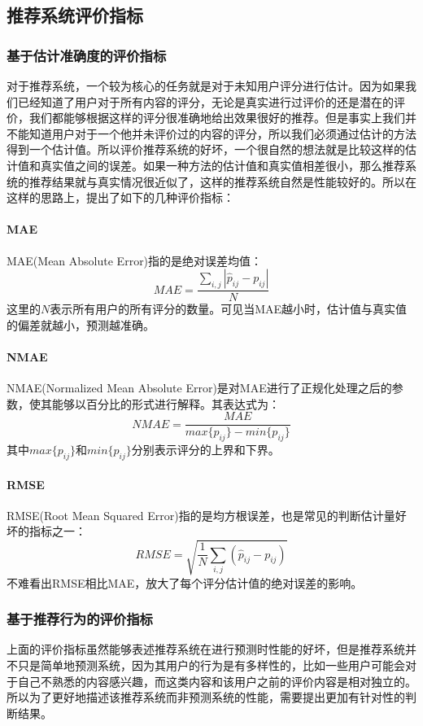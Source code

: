 \subsection{推荐系统评价指标}
\subsubsection{基于估计准确度的评价指标}
对于推荐系统，一个较为核心的任务就是对于未知用户评分进行估计。因为如果我们已经知道了用户对于所有内容的评分，无论是真实进行过评价的还是潜在的评价，我们都能够根据这样的评分很准确地给出效果很好的推荐。但是事实上我们并不能知道用户对于一个他并未评价过的内容的评分，所以我们必须通过估计的方法得到一个估计值。所以评价推荐系统的好坏，一个很自然的想法就是比较这样的估计值和真实值之间的误差。如果一种方法的估计值和真实值相差很小，那么推荐系统的推荐结果就与真实情况很近似了，这样的推荐系统自然是性能较好的。所以在这样的思路上，提出了如下的几种评价指标\cite{EVA}：
\paragraph{MAE}
MAE(Mean Absolute Error)指的是绝对误差均值\cite{MAE}：
\begin{equation}
    MAE = \frac{\sum_{i, j}|\hat p_{ij} - p_{ij}|}{N}
\end{equation}
这里的$N$表示所有用户的所有评分的数量。可见当MAE越小时，估计值与真实值的偏差就越小，预测越准确。

\paragraph{NMAE}
NMAE(Normalized Mean Absolute Error)是对MAE进行了正规化处理之后的参数，使其能够以百分比的形式进行解释\cite{MAE}。其表达式为：
\begin{equation}
    NMAE = \frac{MAE}{max\{p_{ij}\} - min\{p_{ij}\}}
\end{equation}
其中$max\{p_{ij}\}$和$min\{p_{ij}\}$分别表示评分的上界和下界。

\paragraph{RMSE}
RMSE(Root Mean Squared Error)指的是均方根误差，也是常见的判断估计量好坏的指标之一：
\begin{equation}
    RMSE = \sqrt{\frac{1}{N}\sum_{i,j}(\hat p_{ij} - p_{ij})}
\end{equation}
不难看出RMSE相比MAE，放大了每个评分估计值的绝对误差的影响。

\subsubsection{基于推荐行为的评价指标}
上面的评价指标虽然能够表述推荐系统在进行预测时性能的好坏，但是推荐系统并不只是简单地预测系统，因为其用户的行为是有多样性的，比如一些用户可能会对于自己不熟悉的内容感兴趣，而这类内容和该用户之前的评价内容是相对独立的。所以为了更好地描述该推荐系统而非预测系统的性能，需要提出更加有针对性的判断结果。

